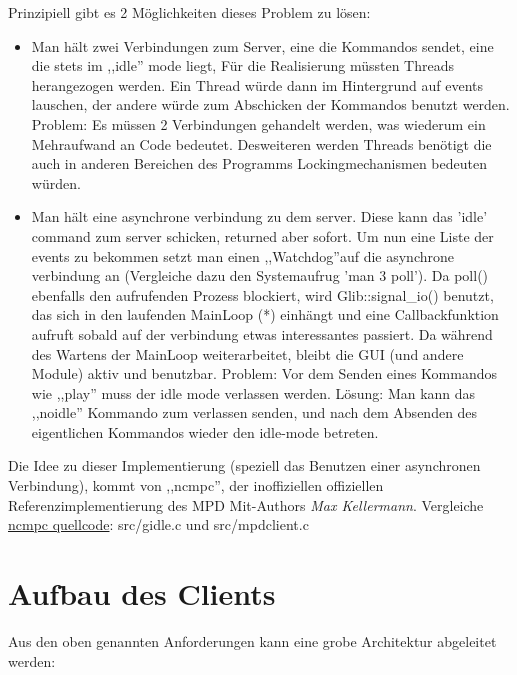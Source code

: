 Prinzipiell gibt es 2 Möglichkeiten dieses Problem zu lösen:
\begin{itemize}
    \item Man hält zwei Verbindungen zum Server, eine die Kommandos sendet, eine die stets im ,,idle'' mode liegt,
        Für die Realisierung müssten Threads herangezogen werden. Ein Thread würde dann im Hintergrund auf events lauschen,
        der andere würde zum Abschicken der Kommandos benutzt werden.
        Problem: Es müssen 2 Verbindungen gehandelt werden, was wiederum ein Mehraufwand an Code bedeutet.
        Desweiteren werden Threads benötigt die auch in anderen Bereichen des Programms Lockingmechanismen bedeuten würden.
    \item Man hält eine asynchrone verbindung zu dem server.
        Diese kann das 'idle' command zum server schicken, returned aber sofort. Um nun eine Liste der events zu bekommen setzt man 
        einen ,,Watchdog''auf die asynchrone verbindung an (Vergleiche dazu den Systemaufrug 'man 3 poll'). Da poll() ebenfalls den
        aufrufenden Prozess blockiert, wird Glib::signal\_io() benutzt, das sich in den laufenden MainLoop (*) einhängt und eine 
        Callbackfunktion aufruft sobald auf der verbindung etwas interessantes passiert. Da während des Wartens der MainLoop weiterarbeitet,
        bleibt die GUI (und andere Module) aktiv und benutzbar.
        Problem: Vor dem Senden eines Kommandos wie ,,play'' muss der idle mode verlassen werden.
        Lösung: Man kann das ,,noidle'' Kommando zum verlassen senden, und nach dem Absenden des eigentlichen Kommandos wieder den idle-mode betreten.
\end{itemize}





Die Idee zu dieser Implementierung (speziell das Benutzen einer asynchronen Verbindung), kommt von ,,ncmpc'',
der inoffiziellen offiziellen Referenzimplementierung des MPD Mit-Authors \emph{Max Kellermann}.
Vergleiche \href{http://mpd.wikia.com/wiki/Client:Ncmpc}{ncmpc quellcode}: src/gidle.c und src/mpdclient.c


\section{Aufbau des Clients}
Aus den oben genannten Anforderungen kann eine grobe Architektur abgeleitet werden:

